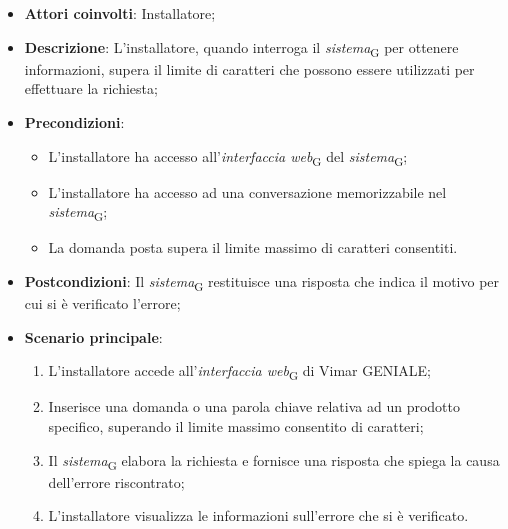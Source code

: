 \begin{itemize}
    \item \textbf{Attori coinvolti}: Installatore;
    \item \textbf{Descrizione}: L’installatore, quando interroga il \textit{sistema}\textsubscript{G} per ottenere informazioni, supera il limite di caratteri che possono essere utilizzati per effettuare la richiesta;
    \item \textbf{Precondizioni}: 
    \begin{itemize}
        \item L’installatore ha accesso all’\textit{interfaccia web}\textsubscript{G} del \textit{sistema}\textsubscript{G};
        \item L’installatore ha accesso ad una conversazione memorizzabile nel \textit{sistema}\textsubscript{G};
        \item La domanda posta supera il limite massimo di caratteri consentiti.
    \end{itemize}
    \item \textbf{Postcondizioni}: Il \textit{sistema}\textsubscript{G} restituisce una risposta che indica il motivo per cui si è verificato l’errore;
    \item \textbf{Scenario principale}:
    \begin{enumerate}
        \item L’installatore accede all’\textit{interfaccia web}\textsubscript{G} di Vimar GENIALE;
        \item Inserisce una domanda o una parola chiave relativa ad un prodotto specifico, superando il limite massimo consentito di caratteri;
        \item Il \textit{sistema}\textsubscript{G} elabora la richiesta e fornisce una risposta che spiega la causa dell'errore riscontrato;
        \item L’installatore visualizza le informazioni sull’errore che si è verificato.
    \end{enumerate}
\end{itemize}



